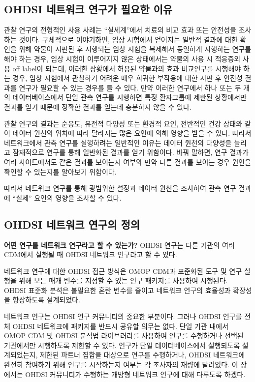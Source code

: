 \documentclass[10.5pt]{book}
\theoremstyle{definition}
\theoremstyle{definition}
\theoremstyle{definition}
\theoremstyle{remark}
\let\BeginKnitrBlock\begin \let\EndKnitrBlock\end
\begin{document}
\subsection{OHDSI 네트워크 연구가 필요한 이유}\label{ohdsi----}

관찰 연구의 전형적인 사용 사례는 ``실세계''에서 치료의 비교 효과 또는
안전성을 조사하는 것이다. 구체적으로 이야기하면, 임상 시험에서 얻어지는
일반적 결과에 대한 확인을 위해 약물이 시판된 후 시행되는 임상 시험을
복제해서 동일하게 시행하는 연구를 해야 하는 경우, 임상 시험이 이루어지지
않은 상태에서는 약물의 사용 시 적응증외 사용 off label이 되는데, 이러한
상황에서 허용된 약물과의 효과 비교연구를 시행해야 하는 경우, 임상
시험에서 관찰하기 어려운 매우 희귀한 부작용에 대한 시판 후 안전성 결과를
연구가 필요할 수 있는 경우를 들 수 있다. 만약 이러한 연구에서 하나 또는
두 개의 데이터베이스에서 단일 관측 연구를 시행하면 특정 환자그룹에
제한된 상황에서만 결과를 얻기 때문에 정확한 결과를 얻는데 충분하지 않을
수 있다.

관찰 연구의 결과는 순응도, 유전적 다양성 또는 환경적 요인, 전반적인 건강
상태와 같이 데이터 원천의 위치에 따라 달라지는 많은 요인에 의해 영향을
받을 수 있다. 따라서 네트워크에서 관측 연구를 실행하려는 일반적인 이유는
데이터 원천의 다양성을 늘리고 잠재적으로 연구를 통해 일반화된 결과를
얻기 위함이다. 바꿔 말하면, 연구 결과가 여러 사이트에서도 같은 결과를
보이는지 여부와 만약 다른 결과를 보이는 경우 원인을 확인할 수 있는지를
알아보기 위함이다.

따라서 네트워크 연구를 통해 광범위한 설정과 데이터 원천을 조사하여 관측
연구 결과에 ``실제'' 요인의 영향을 조사할 수 있다.

\subsection{OHDSI 네트워크 연구의 정의}\label{ohdsi---}

\BeginKnitrBlock{rmdimportant}
\textbf{어떤 연구를 네트워크 연구라고 할 수 있는가?} OHDSI 연구는 다른
기관의 여러 CDM에서 실행될 때 OHDSI 네트워크 연구라고 할 수 있다.
\EndKnitrBlock{rmdimportant}

네트워크 연구에 대한 OHDSI 접근 방식은 OMOP CDM과 표준화된 도구 및 연구
실행을 위해 모든 매개 변수를 지정할 수 있는 연구 패키지를 사용하여
시행된다. OHDSI 표준화 분석은 불필요한 혼란 변수를 줄이고 네트워크
연구의 효율성과 확장성을 향상하도록 설계되었다.

네트워크 연구는 OHDSI 연구 커뮤니티의 중요한 부분이다. 그러나 OHDSI
연구를 전체 OHDSI 네트워크에 패키지를 반드시 공유할 의무는 없다. 단일
기관 내에서 OMOP CDM 및 OHDSI 분석법 라이브러리를 사용하여 연구를
수행하거나 선택된 기관에서만 시행하도록 제한할 수 있다. 연구가 단일
데이터베이스에서 실행되도록 설계되었는지, 제한된 파트너 집합을 대상으로
연구를 수행하거나, OHDSI 네트워크에 완전히 참여하기 위해 연구를
시작하는지 여부는 각 조사자의 재량에 달려있다. 이 장에서는 OHDSI
커뮤니티가 수행하는 개방형 네트워크 연구에 대해 다루도록 하겠다.
\end{document}
